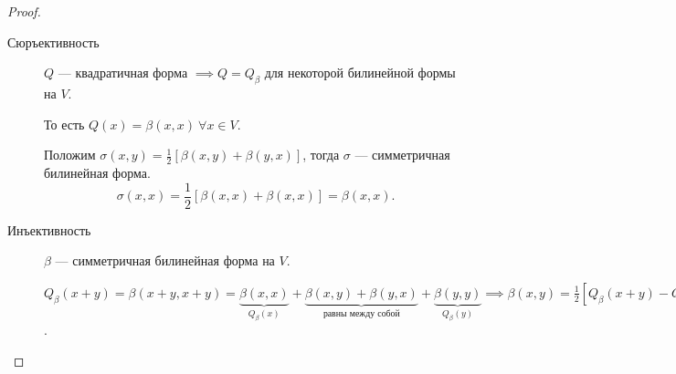 \begin{proof}~
    \begin{description}
    \item[Сюръективность] $Q$ --- квадратичная форма $ \implies Q = Q_\beta$ для некоторой билинейной формы на $V$.

        То есть $Q(x) = \beta(x, x) \ \forall x \in V$.

        Положим $\sigma(x, y) = \frac{1}{2} \left[\beta(x, y) + \beta(y, x)\right]$, тогда $\sigma$ --- симметричная билинейная форма.
        \begin{equation*}
            \sigma(x, x) = \frac{1}{2}\left[\beta(x, x) + \beta(x, x)\right] = \beta(x, x)
        .\end{equation*}

    \item[Инъективность] $\beta$ --- симметричная билинейная форма на $V$.

        $Q_\beta(x + y) = \beta(x + y, x + y) = \underbrace{\beta(x, x)}_{Q_\beta(x)} + \underbrace{\beta(x, y) + \beta(y, x)}_{\text{равны между собой}} + \underbrace{\beta(y, y)}_{Q_\beta(y)} \implies \beta(x, y) = \frac{1}{2} \left[Q_\beta(x + y) - Q_\beta(x) - Q_\beta(y)\right]$.
    \end{description}
\end{proof}

